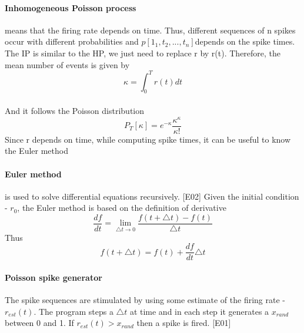 \documentclass{report}
\begin{document}
\paragraph{Inhomogeneous Poisson process} means that the firing rate depends on time. Thus, different sequences of n spikes occur with different probabilities and $p[1_{1}, t_{2},...,t_{n}]$depends on the spike times. The IP is similar to the HP, we just need to replace r by r(t). Therefore, the mean number of events is given by
\begin{equation}
\kappa=\int_{0}^{T}r(t)dt
\end{equation}
\\And it follows the Poisson distribution
\begin{equation}
P_{T}[\kappa] = e^{-\kappa}\frac{\kappa^{\kappa}}{\kappa!}
\end{equation}
Since r depends on time, while computing spike times, it can be useful to know the Euler method
\paragraph{Euler method }  is used to solve differential equations recursively. {\color{blue} [E02]} Given the initial condition - $r_{0}$, the Euler method is based on the definition of derivative
\begin{equation}
\frac{df}{dt}=\lim_{\triangle t \to 0}\frac{f(t+\triangle t)-f(t)}{\triangle t}
\end{equation}
Thus
\begin{equation}
f(t + \triangle t) = f(t) + \frac{df}{dt}\triangle t
\end{equation}
\paragraph{Poisson spike generator }
The spike sequences are stimulated by using some estimate of the firing rate - $r_{est}(t)$. The program steps a $\triangle t$ at time and in each step it generates a $x_{rand}$ between 0 and 1. If $r_{est}(t)>x_{rand}$ then a spike is fired. {\color{blue} [E01]}
\end{document}
